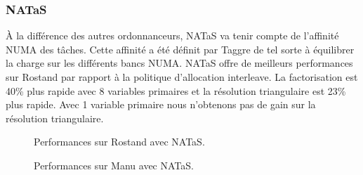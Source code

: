 \subsubsection{NATaS}
\`A la différence des autres ordonnanceurs, NATaS va tenir compte de l'affinité NUMA des tâches.
%
Cette affinité a été définit par Taggre de tel sorte à équilibrer la charge sur les différents bancs NUMA.
%
NATaS offre de meilleurs performances sur Rostand par rapport à la politique d'allocation interleave.
%
La factorisation est 40\% plus rapide avec 8 variables primaires et la résolution triangulaire est 23\% plus rapide.
%
Avec 1 variable primaire nous n'obtenons pas de gain sur la résolution triangulaire.


\begin{figure}[!h]
     \begin{center}
    \end{center}
    \caption{Performances sur Rostand avec NATaS.}
\end{figure}



\begin{figure}[!h]
     \begin{center}
    \end{center}
    \caption{Performances sur Manu avec NATaS.}
\end{figure}
